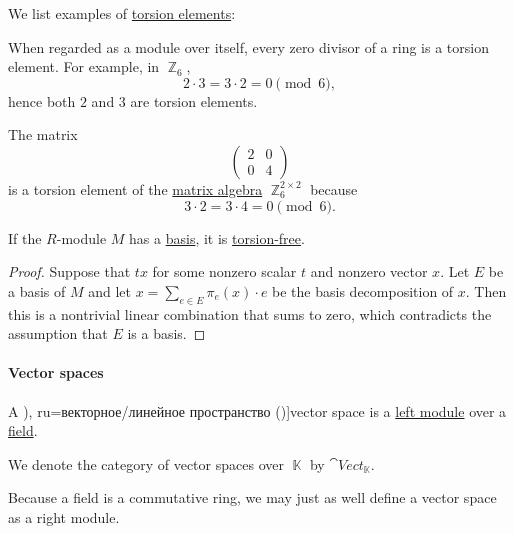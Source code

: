 \begin{example}\label{ex:def:module_torsion}
  We list examples of \hyperref[def:module_torsion]{torsion elements}:
  \begin{thmenum}
     When regarded as a module over itself, every zero divisor of a ring is a torsion element. For example, in \( \BbbZ_6 \),
    \begin{equation*}
      2 \cdot 3 = 3 \cdot 2 = 0 \pmod 6,
    \end{equation*}
    hence both \( 2 \) and \( 3 \) are torsion elements.

     The matrix
    \begin{equation*}
      \begin{pmatrix}
        2 & 0 \\
        0 & 4
      \end{pmatrix}
    \end{equation*}
    is a torsion element of the \hyperref[thm:matrix_algebra]{matrix algebra} \( \BbbZ_6^{2 \times 2} \) because
    \begin{equation*}
      3 \cdot 2 = 3 \cdot 4 = 0 \pmod 6.
    \end{equation*}
  \end{thmenum}
\end{example}

\begin{proposition}\label{thm:basis_implies_torsion_free}
  If the \( R \)-module \( M \) has a \hyperref[def:hamel_basis]{basis}, it is \hyperref[def:module_torsion]{torsion-free}.
\end{proposition}
\begin{proof}
  Suppose that \( tx \) for some nonzero scalar \( t \) and nonzero vector \( x \). Let \( E \) be a basis of \( M \) and let \( x = \sum_{e \in E} \pi_e(x) \cdot e \) be the basis decomposition of \( x \). Then this is a nontrivial linear combination that sums to zero, which contradicts the assumption that \( E \) is a basis.
\end{proof}

\paragraph{Vector spaces}

\begin{definition}\label{def:vector_space}
  A \term[ru=линейно пространство (\cite[111]{Обрешков1962ВисшаАлгебра}), ru=векторное/линейное пространство (\cite[def. 1.6.1]{Винберг2014КурсАлгебры})]{vector space} is a \hyperref[def:module]{left module} over a \hyperref[def:field]{field}.

  We denote the category of vector spaces over \( \BbbK \) by \( \cat{Vect}_{\BbbK} \).
\end{definition}
\begin{comments}
  \item Because a field is a commutative ring, we may just as well define a vector space as a right module.
\end{comments}

